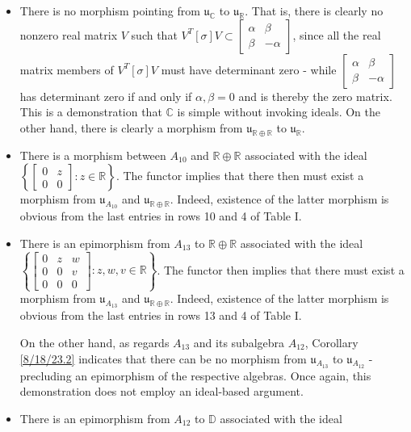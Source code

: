 \documentclass{amsart}
\numberwithin{equation}{section}
\theoremstyle{definition}
\numberwithin{theorem}{section}
\begin{document}
\begin{itemize}
\item  There is no morphism pointing from $\mathfrak{u}_{\mathbb{C}}$ to $\mathfrak{u}_{\mathbb{R}}$. That is, there is clearly no nonzero real matrix $V$ such that $V^T[\sigma]V \subset \left[\begin{array}{ccc}
 \alpha & \beta   \\ 
 \beta & -\alpha    
\end{array}\right]$, since all the real matrix members of $V^T[\sigma]V$  must have determinant zero - while $\left[\begin{array}{ccc}
 \alpha & \beta   \\ 
 \beta & -\alpha    
\end{array}\right]$ has determinant zero if and only if $\alpha,\beta = 0$ and is thereby the zero matrix. This is a demonstration that $\mathbb{C}$ is simple without invoking ideals.  On the other hand, there is clearly a morphism from $\mathfrak{u}_{\mathbb{R}\oplus\mathbb{R}}$ to $\mathfrak{u}_{\mathbb{R}}$.
\item There is a morphism between $A_{10}$ and $\mathbb{R}\oplus\mathbb{R}$ associated with the ideal $\left\{\left[\begin{array}{ccc}
 0 & z   \\ 
 0 & 0    
\end{array}\right]:z\in \mathbb{R}\right\}$.  The functor implies that there then must exist a morphism from $\mathfrak{u}_{A_{10}}$ and $\mathfrak{u}_{\mathbb{R}\oplus\mathbb{R}}$.  Indeed, existence of the latter morphism is obvious from the last entries in rows 10 and 4 of Table I.  
\item There is an epimorphism from $A_{13}$ to $\mathbb{R}\oplus\mathbb{R}$ associated with the ideal $\left\{\left[\begin{array}{ccc}
0  & z & w   \\
 0 & 0 & v \\
 0 & 0 & 0    
\end{array}\right]:z,w,v\in\mathbb{R}\right\}$. The functor then implies that there must exist a morphism from $\mathfrak{u}_{A_{13}}$ and $\mathfrak{u}_{\mathbb{R}\oplus\mathbb{R}}$.  Indeed, existence of the latter morphism is obvious from the last entries in rows 13 and 4 of Table I.  

On the other hand, as regards $A_{13}$ and its subalgebra $A_{12}$, Corollary \ref{8/18/23.2} indicates that there can be no morphism from $\mathfrak{u}_{A_{13}}$ to $\mathfrak{u}_{A_{12}}$ - precluding an epimorphism of the respective algebras.  Once again, this demonstration does not employ an ideal-based argument.
\item 
There is an epimorphism from $A_{12}$ to  $\mathbb{D}$ associated with the ideal


\end{itemize}
\end{document}

